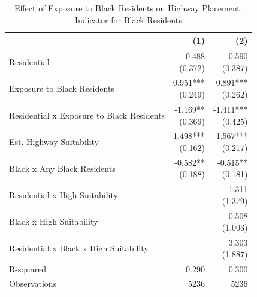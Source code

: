 \begin{table}[h]
\centering
\caption{Effect of Exposure to Black Residents on Highway Placement: Indicator for Black Residents}
\label{tab:results/black_share_indicator}
\begin{threeparttable}
\begin{tabular*}{1\textwidth}{@{\extracolsep{\fill}}l*{2}{r}}
\toprule
 & (1) & (2) \\
\midrule
Residential & \makecell[tr]{-0.488 \\ (0.372)} & \makecell[tr]{-0.590 \\ (0.387)} \\
Exposure to Black Residents & \makecell[tr]{0.951{***} \\ (0.249)} & \makecell[tr]{0.891{***} \\ (0.262)} \\
Residential x Exposure to Black Residents & \makecell[tr]{-1.169{**} \\ (0.369)} & \makecell[tr]{-1.411{***} \\ (0.425)} \\
Est. Highway Suitability & \makecell[tr]{1.498{***} \\ (0.162)} & \makecell[tr]{1.567{***} \\ (0.217)} \\
Black x Any Black Residents & \makecell[tr]{-0.582{**} \\ (0.188)} & \makecell[tr]{-0.515{**} \\ (0.181)} \\
Residential x High Suitability &  & \makecell[tr]{1.311 \\ (1.379)} \\
Black x High Suitability &  & \makecell[tr]{-0.508 \\ (1.003)} \\
Residential x Black x High Suitability &  & \makecell[tr]{3.303 \\ (1.887)} \\
R-squared & 0.290 & 0.300 \\
Observations & 5236 & 5236 \\
\bottomrule
\end{tabular*}
\begin{tablenotes}[flushleft]
\footnotesize

\end{tablenotes}
\end{threeparttable}
\end{table}
